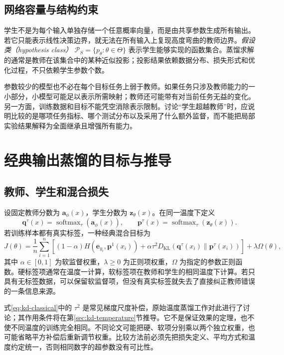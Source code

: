 \documentclass[UTF8,12pt,a4paper,fontset=fandol]{ctexart}
\begin{document}
\subsection{网络容量与结构约束}
学生不是为每个输入单独存储一个任意概率向量，而是由共享参数生成所有输出。若它只能表示线性决策边界，就无法在所有输入上复现高度弯曲的教师边界。\emph{假设类（hypothesis class）} $\mathcal P_S=\{p_\theta:\theta\in\Theta\}$ 表示学生能够实现的函数集合。蒸馏求解的通常是教师在该集合中的某种近似投影；投影结果依赖数据分布、损失形式和优化过程，不只依赖学生参数个数。

参数较少的模型也不必在每个目标任务上弱于教师。如果任务只涉及教师能力的一小部分，小模型可能足以表示所需映射；教师还可能带有对当前任务无益的变化。另一方面，训练数据和目标不能凭空消除表示限制。讨论“学生超越教师”时，应说明比较的是哪项任务指标、哪个测试分布以及采用了什么额外监督，而不能把局部实验结果解释为全面继承且增强所有能力。

\section{经典输出蒸馏的目标与推导}
\label{sec:kd-classical}

\subsection{教师、学生和混合损失}
设固定教师分数为 $\mathbf a_\phi(x)$，学生分数为 $\mathbf z_\theta(x)$。在同一温度下定义
\[
 \mathbf q^\tau(x)=\operatorname{softmax}_\tau(\mathbf a_\phi(x)),\qquad
 \mathbf p^\tau(x)=\operatorname{softmax}_\tau(\mathbf z_\theta(x)).
\]
若训练样本都有真实标签，一种经典混合目标为
\begin{equation}
 J(\theta)=\frac1n\sum_{i=1}^n\left[
 (1-\alpha)H(\mathbf e_{y_i},\mathbf p^1(x_i))
 +\alpha\tau^2D_{\mathrm{KL}}(\mathbf q^\tau(x_i)\|\mathbf p^\tau(x_i))
 \right]+\lambda\Omega(\theta),
 \label{eq:kd-classical}
\end{equation}
其中 $\alpha\in[0,1]$ 为软监督权重，$\lambda\geq0$ 为正则项权重，$\Omega$ 为指定的参数正则函数。硬标签项通常在温度一计算，软标签项在教师和学生的相同温度下计算。若只具有无标签数据，可以保留软监督项，但没有真实标签就失去了直接纠正教师错误的一条信息来源。

式\eqref{eq:kd-classical}中的 $\tau^2$ 是常见梯度尺度补偿，原始温度蒸馏工作对此进行了讨论\cite{hinton2015}；其作用条件将在第\ref{sec:kd-temperature}节推导。它不是保证效果的定理，也不使不同温度的训练完全相同。不同论文可能把硬、软项分别乘以两个独立权重，也可能省略平方补偿后重新调节权重。比较方法前必须先把损失定义、平均方式和温度约定统一，否则相同数字的超参数没有可比性。
\end{document}
